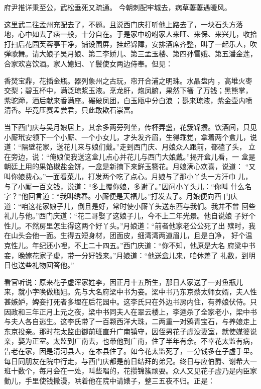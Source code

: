 府尹推详秉至公，武松垂死又疏通。
今朝刺配牢城去，病草萋萋遇暖风。

这里武二往孟州充配去了，不题。且说西门庆打听他上路去了，一块石头方落
地，心中如去了痞一般，十分自在。于是家中吩咐家人来旺、来保、来兴儿，收拾
打扫后花园芙蓉亭干净，铺设围屏，挂起锦障，安排酒席齐整，叫了一起乐人，吹
弹歌舞。请大娘子吴月娘、第二李娇儿、第三孟玉楼、第四孙雪娥、第五潘金莲，
合家欢喜饮酒。家人媳妇、丫鬟使女两边侍奉。但见：

香焚宝鼎，花插金瓶。器列象州之古玩，帘开合浦之明珠。水晶盘内
，高堆火枣交梨；碧玉杯中，满泛琼浆玉液。烹龙肝，炮凤腑，果然下箸
了万钱；黑熊掌，紫驼蹄，酒后献来香满座。碾破凤团，白玉瓯中分白浪
；斟来琼液，紫金壶内喷清香。毕竟压赛孟尝君，只此敢欺石崇富。

当下西门庆与吴月娘居上，其余多两旁列坐，传杯弄盏，花簇锦攒。饮酒间，只见
小厮玳安领下一个小厮、一个小女儿，才头发齐眉，生得乖觉，拿着两个盒儿，说
道：“隔壁花家，送花儿来与娘们戴。”走到西门庆、月娘众人跟前，都磕了头，
立在旁边，说：“俺娘使我送这盒儿点心并花儿与西门大娘戴。”揭开盒儿看，一
盒是朝廷上用的果馅椒盐金饼，一盒是新摘下来鲜玉簪花。月娘满心欢喜，说道：
“又叫你娘费心。”一面看菜儿，打发两个吃了点心。月娘与了那小丫头一方汗巾
儿，与了小厮一百文钱，说道：“多上覆你娘，多谢了。”因问小丫头儿：“你叫
什么名字？”他回言道：“我叫绣春。小厮便是天福儿。”打发去了。月娘便向西
门庆道：“咱这花家娘子儿，倒且是好，常时使小厮丫头送东西与我们。我并不曾
回些礼儿与他。”西门庆道：“花二哥娶了这娘子儿，今不上二年光景。他自说娘
子好个性儿。不然房里怎生得这两个好丫头。”月娘道：“前者他家老公公死了出
殡时，我在山头会他一面。生得五短身材，团面皮，细湾湾两道眉儿，且是白净，
好个温克性儿。年纪还小哩，不上二十四五。”西门庆道：“你不知，他原是大名
府梁中书妾，晚嫁花家子虚，带一分好钱来。”月娘道：“他送盒儿来，咱休差了
礼数，到明日也送些礼物回答他。”

看官听说：原来花子虚浑家姓李，因正月十五所生，那日人家送了一对鱼瓶儿
来，就小字唤做瓶姐。先与大名府梁中书为妾。梁中书乃东京蔡太师女婿，夫人性
甚嫉妒，婢妾打死者多埋在后花园中。这李氏只在外边书房内住，有养娘伏侍。只
因政和三年正月上元之夜，梁中书同夫人在翠云楼上，李逵杀了全家老小，梁中书
与夫人各自逃生。这李氏带了一百颗西洋大珠，二两重一对鸦青宝石，与养娘走上
东京投亲。那时花太监由御前班直升广南镇守，因侄男花子虚没妻室，就使媒婆说
亲，娶为正室。太监到广南去，也带他到广南，住了半年有余。不幸花太监有病，
告老在家，因是清河县人，在本县住了。如今花太监死了，一分钱多在子虚手里。
每日同朋友在院中行走，与西门庆都是前日结拜的弟兄。终日与应伯爵、谢希大一
班十数个，每月会在一处，叫些唱的，花攒锦簇顽耍。众人又见花子虚乃是内臣家
勤儿，手里使钱撒漫，哄着他在院中请婊子，整三五夜不归。正是：

